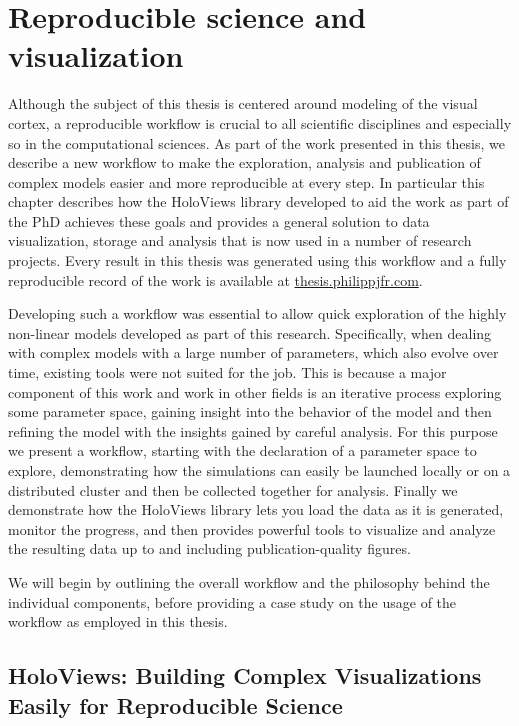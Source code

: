 \chapter{Reproducible science and visualization}

Although the subject of this thesis is centered around modeling of the
visual cortex, a reproducible workflow is crucial to all scientific
disciplines and especially so in the computational sciences. As part
of the work presented in this thesis, we describe a new workflow to
make the exploration, analysis and publication of complex models
easier and more reproducible at every step. In particular this chapter
describes how the HoloViews library developed to aid the work as part
of the PhD achieves these goals and provides a general solution to
data visualization, storage and analysis that is now used in a number
of research projects. Every result in this thesis was generated using
this workflow and a fully reproducible record of the work is available
at \url{thesis.philippjfr.com}.

Developing such a workflow was essential to allow quick exploration of
the highly non-linear models developed as part of this
research. Specifically, when dealing with complex models with a large
number of parameters, which also evolve over time, existing tools were
not suited for the job. This is because a major component of this work
and work in other fields is an iterative process exploring some
parameter space, gaining insight into the behavior of the model and
then refining the model with the insights gained by careful
analysis. For this purpose we present a workflow, starting with the
declaration of a parameter space to explore, demonstrating how the
simulations can easily be launched locally or on a distributed cluster
and then be collected together for analysis. Finally we demonstrate
how the HoloViews library lets you load the data as it is generated,
monitor the progress, and then provides powerful tools to visualize and
analyze the resulting data up to and including publication-quality
figures.

We will begin by outlining the overall workflow and the philosophy
behind the individual components, before providing a case study on
the usage of the workflow as employed in this thesis.

\section{HoloViews: Building Complex Visualizations Easily for Reproducible Science}

